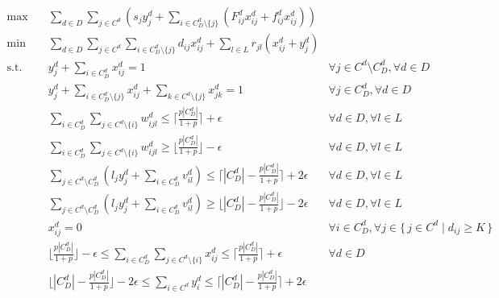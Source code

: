 \documentclass[11pt,twoside]{article}
\numberwithin{Theorem}{section}
\numberwithin{Definition}{section}
\numberwithin{Lemma}{section}
\numberwithin{Algorithm}{section}
\numberwithin{equation}{section}
\begin{document}
\begin{align}
	\max \quad 
	& \sum\nolimits_{d \in D} \sum\nolimits_{j\in C^d} \left( s_j y_j^d + \sum\nolimits_{i \in C_D^d \setminus \{j\}} \left( F_{ij}^d x_{ij}^d + f_{ij}^d x_{ij}^d \right)\right) 
	\label{obj1} \\
	\min \quad
	& \sum\nolimits_{d \in D} \sum\nolimits_{j\in C^d} \sum\nolimits_{i \in C_D^d \setminus \{j\}} d_{ij} x_{ij}^d + \sum\nolimits_{l \in L} r_{jl} \left( x_{ij}^d + y_j^d \right) 
	\label{obj2} \\
	\text{s.t.}\quad 
	& y_j^d + \sum\nolimits_{i \in C_D^d} x_{ij}^d = 1
	& \forall j \in C^d \setminus C_D^d , \forall d \in D \label{assignWalkerOnce} \\
	& y_j^d + \sum\nolimits_{i \in C_D^d \setminus \{j \}} x_{ij}^d + \sum\nolimits_{k \in C^d \setminus \{j\}} x_{jk}^d = 1
	& \forall j \in C_D^d , \forall d \in D \label{assignDriverOnce} \\
	& \sum\nolimits_{i \in C_D^d} \sum\nolimits_{j \in C^d \setminus \{ i \}} w_{ijl}^d \leq \lceil \tfrac{p |C_D^d|}{1 + p} \rceil + \epsilon
	& \forall d \in D , \forall l \in L \label{upperPairLocale} \\
	& \sum\nolimits_{i \in C_D^d} \sum\nolimits_{j \in C^d \setminus \{ i \}} w_{ijl}^d \geq \lfloor \tfrac{p |C_D^d|}{1 + p} \rfloor - \epsilon
	& \forall d \in D , \forall l \in L \label{lowerPairLocale} \\
	& \sum\nolimits_{j \in C^d \setminus C_D^d} \left( l_j y_j^d + \sum\nolimits_{i\in C_D^d} v_{il}^d \right) \leq \lceil |C_D^d| - \tfrac{p |C_D^d|}{1 + p} \rceil + 2 \epsilon
	& \forall d \in D, \forall l \in L \label{upperSoloLocale} \\
	& \sum\nolimits_{j \in C^d \setminus C_D^d} \left( l_j y_j^d + \sum\nolimits_{i\in C_D^d} v_{il}^d \right) \geq \lfloor |C_D^d| - \tfrac{p |C_D^d|}{1 + p} \rfloor - 2 \epsilon
	& \forall d \in D, \forall l \in L \label{lowerSoloLocale} \\
	& x_{ij}^d = 0 
	& \forall i \in C_D^d, \forall j \in \{\, j \in C^d \mid d_{ij} \ge K \,\} \label{pairDistLimit}\\
	& \lfloor \tfrac{p |C_D^d|}{1 + p} \rfloor - \epsilon \leq \sum\nolimits_{i \in C_D^d} \sum\nolimits_{j \in C^d \setminus \{ i \}} x_{ij}^d \leq \lceil \tfrac{p |C_D^d|}{1 + p} \rceil + \epsilon
	& \forall d \in D \label{pairTolerance}\\
	& \lfloor |C_D^d| - \tfrac{p |C_D^d|}{1 + p} \rfloor - 2 \epsilon \leq \sum\nolimits_{i \in C^d} y_i^d \leq \lceil |C_D^d| - \tfrac{p |C_D^d|}{1 + p} \rceil + 2 \epsilon

\end{align}
\end{document}
